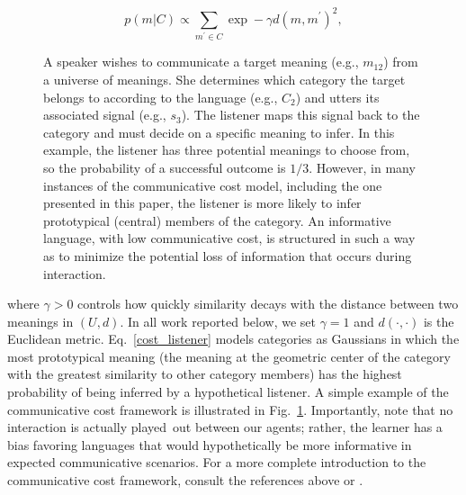 \documentclass[doc,biblatex]{apa7}
\begin{document}
	\begin{equation}
	p(m|C) \propto \sum_{m^\prime \in C} \exp -\gamma d(m,m^\prime)^2,
	\label{cost_listener}
	\end{equation}

	\begin{figure}
	\vspace*{2pt}
	\caption{A speaker wishes to communicate a target meaning (e.g., $m_{12}$) from a universe of meanings. She determines which category the target belongs to according to the language (e.g., $C_2$) and utters its associated signal (e.g., $s_3$). The listener maps this signal back to the category and must decide on a specific meaning to infer. In this example, the listener has three potential meanings to choose from, so the probability of a successful outcome is $1/3$. However, in many instances of the communicative cost model, including the one presented in this paper, the listener is more likely to infer prototypical (central) members of the category. An informative language, with low communicative cost, is structured in such a way as to minimize the potential loss of information that occurs during interaction.}
	\label{fig03}
	\end{figure}

\noindent where $\gamma > 0$ controls how quickly similarity decays with the distance between two meanings in $(U, d)$. In all work reported below, we set $\gamma = 1$ and $d(\cdot,\cdot)$ is the Euclidean metric. Eq.~\ref{cost_listener} models categories as Gaussians in which the most prototypical meaning (the meaning at the geometric center of the category with the greatest similarity to other category members) has the highest probability of being inferred by a hypothetical listener. A simple example of the communicative cost framework is illustrated in Fig.~\ref{fig03}. Importantly, note that no interaction is actually played~out between our agents; rather, the learner has a bias favoring languages that would hypothetically be more informative in expected communicative scenarios. For a more complete introduction to the communicative cost framework, consult the references above or \textcite[p.~38--44]{Carr:2019}.
\end{document}
